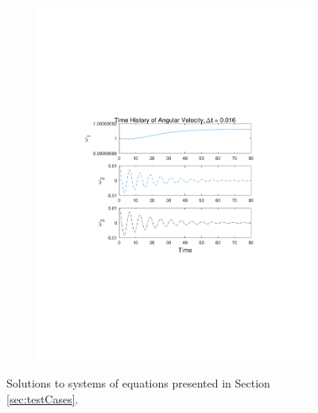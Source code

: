 \documentclass{article}
\begin{document}
\begin{figure}[H]
\begin{subfigure}{0.45\linewidth}
		\includegraphics[trim={1.35in, 3in, 1.5in, 3in}, clip, width=\linewidth]{eulerSoln}
		\caption{}\label{fig:eulerSoln}
	\end{subfigure}
	\caption{Solutions to systems of equations presented in Section \ref{sec:testCases}.}
\end{figure} 
\end{document}

